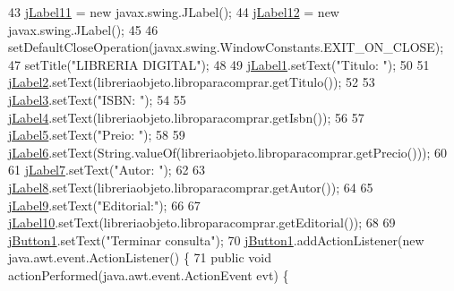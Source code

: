 \begin{DoxyCode}
43         \mbox{\hyperlink{class_interfaz_package_1_1_consulta_libro_ae94f652b20072c79107b06192a514608}{jLabel11}} = \textcolor{keyword}{new} javax.swing.JLabel();
44         \mbox{\hyperlink{class_interfaz_package_1_1_consulta_libro_a22c3d5f2c9bebc19190d3eb57195b720}{jLabel12}} = \textcolor{keyword}{new} javax.swing.JLabel();
45 
46         setDefaultCloseOperation(javax.swing.WindowConstants.EXIT\_ON\_CLOSE);
47         setTitle(\textcolor{stringliteral}{"LIBRERIA DIGITAL"});
48 
49         \mbox{\hyperlink{class_interfaz_package_1_1_consulta_libro_ac77c7946cb8103b592bd26c93868e6dc}{jLabel1}}.setText(\textcolor{stringliteral}{"Titulo: "});
50 
51         \mbox{\hyperlink{class_interfaz_package_1_1_consulta_libro_af5b8586972d0b220d8fc909d2566798f}{jLabel2}}.setText(libreriaobjeto.libroparacomprar.getTitulo());
52 
53         \mbox{\hyperlink{class_interfaz_package_1_1_consulta_libro_a3e4a05b55099ee80351bac56cdc1734b}{jLabel3}}.setText(\textcolor{stringliteral}{"ISBN: "});
54 
55         \mbox{\hyperlink{class_interfaz_package_1_1_consulta_libro_a38c193843e6fdef8523b06eb32530cde}{jLabel4}}.setText(libreriaobjeto.libroparacomprar.getIsbn());
56 
57         \mbox{\hyperlink{class_interfaz_package_1_1_consulta_libro_a49a4d4fb7a30f3fa6d4fe697b5bace17}{jLabel5}}.setText(\textcolor{stringliteral}{"Preio: "});
58 
59         \mbox{\hyperlink{class_interfaz_package_1_1_consulta_libro_aa7ab64f2b86ab31bd150020068712678}{jLabel6}}.setText(String.valueOf(libreriaobjeto.libroparacomprar.getPrecio()));
60 
61         \mbox{\hyperlink{class_interfaz_package_1_1_consulta_libro_a218a7656528bb232eab4f384fed1254e}{jLabel7}}.setText(\textcolor{stringliteral}{"Autor: "});
62 
63         \mbox{\hyperlink{class_interfaz_package_1_1_consulta_libro_afc512066b447316ce167de196273232f}{jLabel8}}.setText(libreriaobjeto.libroparacomprar.getAutor());
64 
65         \mbox{\hyperlink{class_interfaz_package_1_1_consulta_libro_ae312eda737e35580e0221ddbd8c17292}{jLabel9}}.setText(\textcolor{stringliteral}{"Editorial:"});
66 
67         \mbox{\hyperlink{class_interfaz_package_1_1_consulta_libro_aa72af154332185cfbed0dec73bd34450}{jLabel10}}.setText(libreriaobjeto.libroparacomprar.getEditorial());
68 
69         \mbox{\hyperlink{class_interfaz_package_1_1_consulta_libro_a690d079d1efa9d0a7efd0cce09c7f375}{jButton1}}.setText(\textcolor{stringliteral}{"Terminar consulta"});
70         \mbox{\hyperlink{class_interfaz_package_1_1_consulta_libro_a690d079d1efa9d0a7efd0cce09c7f375}{jButton1}}.addActionListener(\textcolor{keyword}{new} java.awt.event.ActionListener() \{
71             \textcolor{keyword}{public} \textcolor{keywordtype}{void} actionPerformed(java.awt.event.ActionEvent evt) \{

\end{DoxyCode}
